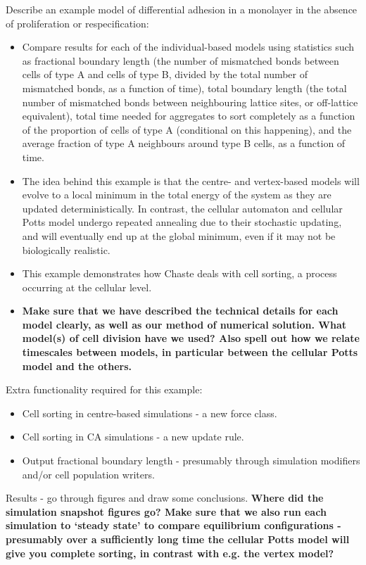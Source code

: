 \documentclass[12pt]{article}
\newcommand{\highlight}[1]{{\color{red} \bf{#1}}}
\begin{document}
\noindent Describe an example model of differential adhesion in a monolayer in the absence of proliferation or respecification:
\begin{itemize}
\item Compare results for each of the individual-based models using statistics such as fractional boundary length (the number of mismatched bonds between cells of type A and cells of type B, divided by the total number of mismatched bonds, as a function of time), total boundary length (the total number of mismatched bonds between neighbouring lattice sites, or off-lattice equivalent), total time needed for aggregates to sort completely as a function of the proportion of cells of type A (conditional on this happening), and the average fraction of type A neighbours around type B cells, as a function of time.
\item The idea behind this example is that the centre- and vertex-based models will evolve to a local minimum in the total energy of the system as they are updated deterministically. In contrast, the cellular automaton and cellular Potts model undergo repeated annealing due to their stochastic updating, and will eventually end up at the global minimum, even if it may not be biologically realistic.
\item This example demonstrates how Chaste deals with cell sorting, a process occurring at the cellular level.
\item \highlight{Make sure that we have described the technical details for each model clearly, as well as our method of numerical solution. 
What model(s) of cell division have we used?
Also spell out how we relate timescales between models, in particular between the cellular Potts model and the others.}
\end{itemize}

\noindent Extra functionality required for this example:
\begin{itemize}
\item Cell sorting in centre-based simulations - a new force class.
\item Cell sorting in CA simulations - a new update rule.
\item Output fractional boundary length - presumably through simulation modifiers and/or cell population writers.
\end{itemize}

\noindent Results - go through figures and draw some conclusions. 
\highlight{Where did the simulation snapshot figures go? 
Make sure that we also run each simulation to `steady state' to compare equilibrium configurations - presumably over a sufficiently long time the cellular Potts model will give you complete sorting, in contrast with e.g. the vertex model?}
\end{document}
